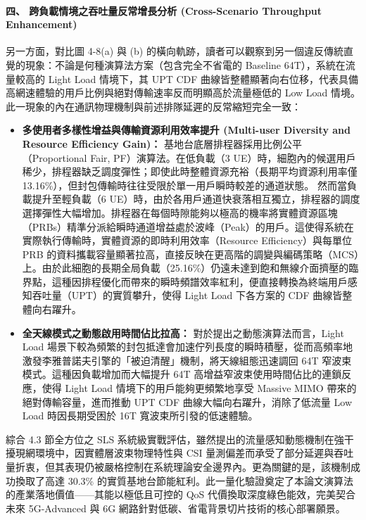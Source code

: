 \paragraph{四、 跨負載情境之吞吐量反常增長分析 (Cross-Scenario Throughput Enhancement)}
另一方面，對比圖 4-8(a) 與 (b) 的橫向軌跡，讀者可以觀察到另一個違反傳統直覺的現象：不論是何種演算法方案（包含完全不省電的 Baseline 64T），系統在流量較高的 Light Load 情境下，其 UPT CDF 曲線皆整體顯著向右位移，代表具備高網速體驗的用戶比例與絕對傳輸速率反而明顯高於流量極低的 Low Load 情境。此一現象的內在通訊物理機制與前述排隊延遲的反常縮短完全一致：
\begin{itemize}
    \item \textbf{多使用者多樣性增益與傳輸資源利用效率提升 (Multi-user Diversity and Resource Efficiency Gain)：} 
    基地台底層排程器採用比例公平（Proportional Fair, PF）演算法。在低負載（3 UE）時，細胞內的候選用戶稀少，排程器缺乏調度彈性；即使此時整體資源充裕（長期平均資源利用率僅 13.16\%），但封包傳輸時往往受限於單一用戶瞬時較差的通道狀態。
    然而當負載提升至輕負載（6 UE）時，由於各用戶通道快衰落相互獨立，排程器的調度選擇彈性大幅增加。排程器在每個時隙能夠以極高的機率將實體資源區塊（PRBs）精準分派給瞬時通道增益處於波峰（Peak）的用戶。這使得系統在實際執行傳輸時，實體資源的即時利用效率（Resource Efficiency）與每單位 PRB 的資料攜載容量顯著拉高，直接反映在更高階的調變與編碼策略（MCS）上。由於此細胞的長期全局負載（25.16\%）仍遠未達到飽和無線介面擠壓的臨界點，這種因排程優化而帶來的瞬時頻譜效率紅利，便直接轉換為終端用戶感知吞吐量（UPT）的實質攀升，使得 Light Load 下各方案的 CDF 曲線皆整體向右躍升。
    
    \item \textbf{全天線模式之動態啟用時間佔比拉高：} 
    對於提出之動態演算法而言，Light Load 場景下較為頻繁的封包抵達會加速佇列長度的瞬時積壓，從而高頻率地激發李雅普諾夫引擎的「被迫清醒」機制，將天線組態迅速調回 64T 窄波束模式。這種因負載增加而大幅提升 64T 高增益窄波束使用時間佔比的連鎖反應，使得 Light Load 情境下的用戶能夠更頻繁地享受 Massive MIMO 帶來的絕對傳輸容量，進而推動 UPT CDF 曲線大幅向右躍升，消除了低流量 Low Load 時因長期受困於 16T 寬波束所引發的低速體驗。
\end{itemize}

綜合 4.3 節全方位之 SLS 系統級實戰評估，雖然提出的流量感知動態機制在強干擾現網環境中，因實體層波束物理特性與 CSI 量測偏差而承受了部分延遲與吞吐量折衷，但其表現仍被嚴格控制在系統理論安全邊界內。更為關鍵的是，該機制成功換取了高達 30.3\% 的實質基地台節能紅利。此一量化驗證奠定了本論文演算法的產業落地價值——其能以極低且可控的 QoS 代價換取深度綠色能效，完美契合未來 5G-Advanced 與 6G 網路針對低碳、省電背景切片技術的核心部署願景。


